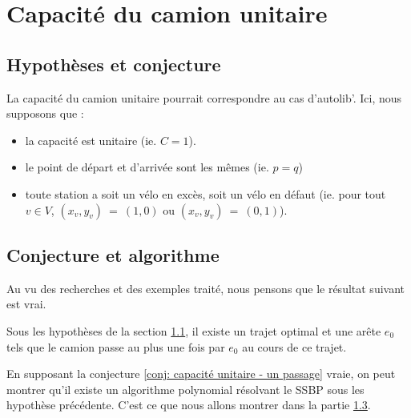 \chapter{Capacité du camion unitaire}
\label{Capacite unitaire}

\section{Hypothèses et conjecture}
\label{Capacité unitaire - hypothèse}

La capacité du camion unitaire pourrait correspondre au cas d'autolib'. Ici, nous supposons que :
\begin{itemize}
\item la capacité est unitaire (ie. $C=1$).
\item le point de départ et d'arrivée sont les mêmes (ie. $p=q$)
\item toute station a soit un vélo en excès, soit un vélo en défaut (ie. pour tout $v \in V$, $(x_v,y_v)~=~(1,0)$ ou $(x_v,y_v)~=~(0,1)$).
\end{itemize}

\section{Conjecture et algorithme}

Au vu des recherches et des exemples traité, nous pensons que le résultat suivant est vrai.

\begin{conj} \label{conj: capacité unitaire - un passage}
Sous les hypothèses de la section \ref{Capacité unitaire - hypothèse}, il existe un trajet optimal et une arête $e_0$ tels que le camion passe au plus une fois par $e_0$ au cours de ce trajet.
\end{conj}

En supposant la conjecture \ref{conj: capacité unitaire - un passage} vraie, on peut montrer qu'il existe un algorithme polynomial résolvant le SSBP sous les hypothèse précédente. C'est ce que nous allons montrer dans la partie \ref{Capicité unitaire preuve}.

\section{}
\label{Capicité unitaire preuve}
